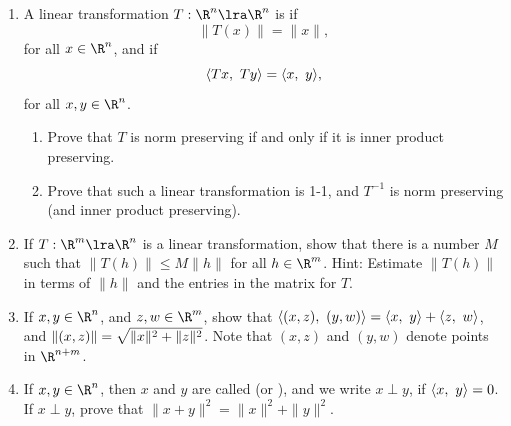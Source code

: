 \documentclass[11pt, a4paper, parskip=full]{scrartcl}
\begin{document}
\begin{enumerate}
\begin{enumerate}
\end{enumerate}

\item	A linear transformation $T:\R^n\lra\R^n$ is  if
$$\|T(x)\|=\|x\|,$$ for all $x\in\R^n$, and  if
$${\left\langle {Tx},~{Ty} \right\rangle} = {\left\langle {x},~{y} \right\rangle},$$ for all $x,y\in\R^n$.
\begin{enumerate}
	\item	Prove that $T$  is norm preserving if and only if it is inner
	product preserving.

	\item	Prove that such a linear transformation is 1-1, and $T^{-1}$ is
	norm preserving (and inner product preserving).
\end{enumerate}

\item\label{bddlin}	If $T:\R^m\lra\R^n$ is a linear transformation, show that there is a
number $M$ such that $\|T(h)\|\leq M\|h\|$ for all $h\in\R^m$.  Hint: Estimate
$\|T(h)\|$ in terms of $\|h\|$ and the entries in the matrix for $T$.

\item	If $x,y\in\R^n$, and $z,w\in\R^m$, show that $\displaystyle{\left\langle {(x,z)},~{(y,w)} \right\rangle} = {\left\langle {x},~{y} \right\rangle}
+ {\left\langle {z},~{w} \right\rangle}$, and $\displaystyle\|(x,z)\| = \sqrt{\|x\|^2 + \|z\|^2}$.  Note that $(x,z)$ and
$(y,w)$ denote points in $\R^{n+m}$.

\item	If $x,y\in\R^n$, then $x$ and $y$ are called  (or
), and we write $x\perp y$, if ${\left\langle {x},~{y} \right\rangle} = 0$.  If $x\perp y$,
prove that $\|x+y\|^2 = \|x\|^2 + \|y\|^2$.

\end{enumerate}
\end{document}
